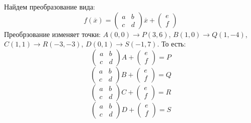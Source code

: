 \documentclass [a4paper,12pt]{article}
\begin{document}
\section{} %
Найдем преобразование вида:
\begin{equation*}
f({\overline{x}})=\begin{pmatrix}
a & b\\
c & d
\end{pmatrix}{\overline{x}} +
\begin{pmatrix}
e\\
f
\end{pmatrix}
\end{equation*}
Преобрзование изменяет точки: $A(0,0)\rightarrow P(3,6)$, $B(1,0)\rightarrow Q(1,-4)$,
$C(1,1) \rightarrow R(-3,-3)$, $D(0,1)\rightarrow S(-1,7)$. То есть:\\
\begin{equation*}
\begin{pmatrix}
a & b\\
c & d
\end{pmatrix}A +
\begin{pmatrix}
e\\
f
\end{pmatrix} = P
\end{equation*}
\begin{equation*}
\begin{pmatrix}
a & b\\
c & d
\end{pmatrix}B +
\begin{pmatrix}
e\\
f
\end{pmatrix} = Q
\end{equation*}
\begin{equation*}
\begin{pmatrix}
a & b\\
c & d
\end{pmatrix}C +
\begin{pmatrix}
e\\
f
\end{pmatrix} = R
\end{equation*}
\begin{equation*}
\begin{pmatrix}
a & b\\
c & d
\end{pmatrix}D +
\begin{pmatrix}
e\\
f
\end{pmatrix} = S
\end{equation*}
\end{document}
